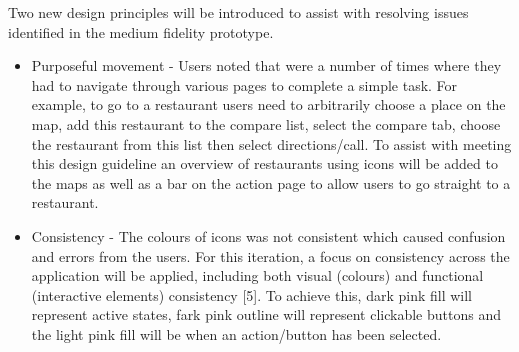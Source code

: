 \documentclass[a4 paper, 12pt]{article}
\begin{document}
    Two new design principles will be introduced to assist with resolving issues identified in the medium fidelity prototype.
        \begin{itemize}            
            \item Purposeful movement - Users noted that were a number of times where they had to navigate through various pages to complete a simple task. For example, to go to a restaurant users need to arbitrarily choose a place on the map, add this restaurant to the compare list, select the compare tab, choose the restaurant from this list then select directions/call. To assist with meeting this design guideline an overview of restaurants using icons will be added to the maps as well as a bar on the action page to allow users to go straight to a restaurant.
            \item Consistency - The colours of icons was not consistent which caused confusion and errors from the users. For this iteration, a focus on consistency across the application will be applied, including both visual (colours) and functional (interactive elements) consistency [5]. To achieve this, dark pink fill will represent active states, fark pink outline will represent clickable buttons and the light pink fill will be when an action/button has been selected.
        \end{itemize}
\end{document}
